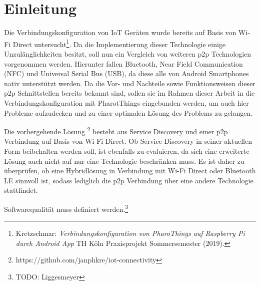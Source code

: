 \section{Einleitung}
        Die Verbindungskonfiguration von IoT Geräten wurde bereits auf Basis von Wi-Fi Direct untersucht\footnote{Kretzschmar: {\it Verbindungskonfiguration von PharoThings auf Raspberry Pi durch Android App} TH Köln Praxisprojekt Sommersemester (2019).}. Da die Implementierung dieser Technologie einige Unzulänglichkeiten besitzt, soll nun ein Vergleich von weiteren p2p Technologien vorgenommen werden. Hierunter fallen Bluetooth, Near Field Communication (NFC) und Universal Serial Bus (USB), da diese alle von Android Smartphones nativ unterstützt werden. Da die Vor- und Nachteile sowie Funktionsweisen dieser p2p Schnittstellen bereits bekannt sind, sollen sie im Rahmen dieser Arbeit in die Verbindungskonfiguration mit PharotThings eingebunden werden, um auch hier Probleme aufzudecken und zu einer optimalen Lösung des Problems zu gelangen.
        
        Die vorhergehende Lösung \footnote{https://github.com/janphkre/iot-connectivity} besteht aus Service Discovery und einer p2p Verbindung auf Basis von Wi-Fi Direct. Ob Service Discovery in seiner aktuellen Form beibehalten werden soll, ist ebenfalls zu evaluieren, da sich eine erweiterte Lösung auch nicht auf nur eine Technologie beschränken muss. Es ist daher zu überprüfen, ob eine Hybridlösung in Verbindung mit Wi-Fi Direct oder Bluetooth LE sinnvoll ist, sodass lediglich die p2p Verbindung über eine andere Technologie stattfindet.

		Softwarequalität muss definiert werden.\footnote{TODO: Liggesmeyer}
